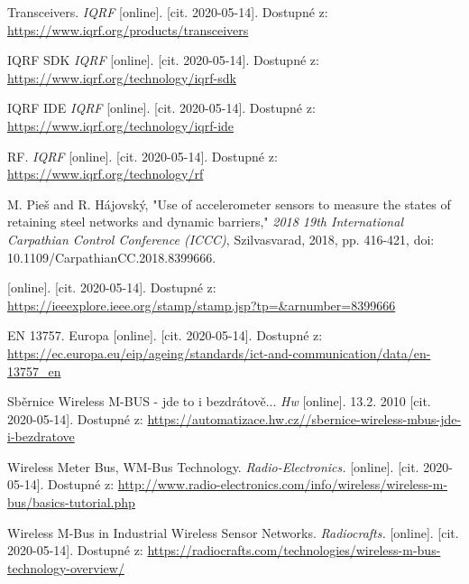 \begin{thebibliography}{9}

Transceivers. \textit{ IQRF } [online]. [cit. 2020-05-14]. Dostupné z: 
\url{
https://www.iqrf.org/products/transceivers
}


IQRF SDK
\textit{
IQRF
}
[online]. [cit. 2020-05-14]. Dostupné z: 
\url{
https://www.iqrf.org/technology/iqrf-sdk
}


IQRF IDE
\textit{
IQRF
}
[online]. [cit. 2020-05-14]. Dostupné z: 
\url{
https://www.iqrf.org/technology/iqrf-ide
}


RF.
\textit{
IQRF
}
[online]. [cit. 2020-05-14]. Dostupné z: 
\url{
https://www.iqrf.org/technology/rf
}


M. Pieš and R. Hájovský, "Use of accelerometer sensors to measure the states of retaining steel networks and dynamic barriers," \textit{ 2018 19th International Carpathian Control Conference (ICCC)}, Szilvasvarad, 2018, pp. 416-421, doi: 10.1109/CarpathianCC.2018.8399666.

[online]. [cit. 2020-05-14]. Dostupné z: 
\url{
https://ieeexplore.ieee.org/stamp/stamp.jsp?tp=&arnumber=8399666
}
 


EN 13757. Europa [online]. [cit. 2020-05-14]. Dostupné z: 
\url{
https://ec.europa.eu/eip/ageing/standards/ict-and-communication/data/en-13757_en
}


Sběrnice Wireless M-BUS - jde to i bezdrátově... 
\textit{ Hw } [online]. 13.2. 2010 [cit. 2020-05-14]. Dostupné z: 
\url{
https://automatizace.hw.cz//sbernice-wireless-mbus-jde-i-bezdratove
}


Wireless Meter Bus, WM-Bus Technology.
\textit{
Radio-Electronics.
}
[online]. [cit. 2020-05-14]. Dostupné z: 
\url{
http://www.radio-electronics.com/info/wireless/wireless-m-bus/basics-tutorial.php
}



Wireless M-Bus in Industrial Wireless Sensor Networks.
\textit{
Radiocrafts.
}
[online]. [cit. 2020-05-14]. Dostupné z: 
\url{
https://radiocrafts.com/technologies/wireless-m-bus-technology-overview/
}



\end{thebibliography}
